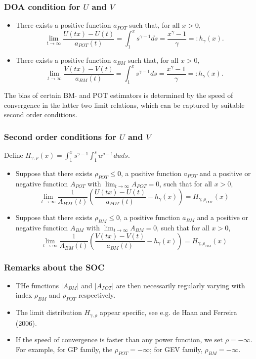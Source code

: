 \documentclass{beamer}
\newcommand{\suit}[1]{\left(#1\right)}
\newcommand{\abs}[1]{\left\vert#1\right\vert}
\begin{document}
\begin{frame}
    \frametitle{DOA condition for $U$ and $V$}
\begin{itemize}
    \item There exists a positive function $a_{POT}$ such that, for all $x>0$,
    $$
        \lim_{t\to\infty}\frac{U(tx)-U(t)}{a_{POT}(t)}=\int_{1}^x s^{\gamma-1}ds = \frac{x^{\gamma}-1}{\gamma}=:h_{\gamma}(x).
    $$
    \item There exists a positive function $a_{BM}$ such that, for all $x>0$,
    $$
    \lim_{t\to\infty}\frac{V(tx)-V(t)}{a_{BM}(t)}=\int_{1}^x s^{\gamma-1}ds = \frac{x^{\gamma}-1}{\gamma}=:h_{\gamma}(x).
    $$
\end{itemize}
The bias of certain BM- and POT estimators is determined by the speed of convergence in the
latter two limit relations, which can be captured by suitable second order conditions.
\end{frame}

\begin{frame}
    \frametitle{Second order conditions for $U$ and $V$}
    Define 
    $
        H_{\gamma,\rho}(x)=\int_{1}^x s^{\gamma-1} \int_{1}^s u^{\rho-1}duds.
    $
\begin{itemize}
    \item Suppose that there exists $\rho_{POT}\le 0$, a positive function $a_{POT}$ and a positive or negative function $A_{POT}$ with $\lim_{t\to\infty} A_{POT}=0$, such that for all $x>0$,
    $$
        \lim_{t\to \infty}\frac{1}{A_{POT}(t)}\suit{\frac{U(tx)-U(t)}{a_{POT}(t)}-h_{\gamma}(x)}=H_{\gamma,\rho_{POT}}(x)
    $$
    \item 
    Suppose that there exists $\rho_{BM}\le 0$, a positive function $a_{BM}$ and a positive or negative function $A_{BM}$ with $\lim_{t\to\infty} A_{BM}=0$, such that for all $x>0$,
    $$
        \lim_{t\to \infty}\frac{1}{A_{BM}(t)}\suit{\frac{V(tx)-V(t)}{a_{BM}(t)}-h_{\gamma}(x)}=H_{\gamma,\rho_{BM}}(x)
    $$
\end{itemize}
    

\end{frame}

\begin{frame}
    \frametitle{Remarks about the SOC}
\begin{itemize}
    \item THe functions $\abs{A_{BM}}$ and $\abs{A_{POT}}$ are then necessarily regularly varying with index $\rho_{BM}$ and $\rho_{POT}$ respectively.
    \item The limit distribution $H_{\gamma,\rho}$ appear specific, see e.g. de Haan and Ferreira (2006).
    \item If the     speed of convergence is faster than any power function, we set $\rho=-\infty$. For example, for GP family, the $\rho_{POT}=-\infty$; for GEV family, $\rho_{BM}=-\infty$.
\end{itemize}
    

\end{frame}
\end{document}
